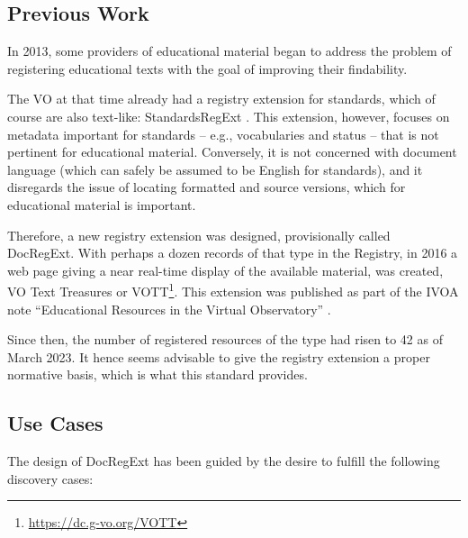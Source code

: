 \documentclass{ivoa}
\begin{document}
\subsection{Previous Work}

In 2013, some providers of educational material began to address the
problem of registering educational texts with the goal of improving
their findability.

The VO at that time already had a registry extension for standards, which of
course are also text-like: StandardsRegExt \citep{2012ivoa.spec.0508H}.  This extension,
however, focuses on metadata important for standards – e.g.,
vocabularies and status – that is not pertinent for educational
material.  Conversely, it is not concerned with document language (which
can safely be assumed to be English for standards), and it disregards
the issue of locating formatted and source versions, which for educational
material is important.

Therefore, a new registry extension was designed, provisionally called
DocRegExt.  With perhaps a dozen records of that type in the Registry,
in 2016 a web page giving a near real-time display of the available
material, was created, VO Text Treasures or
VOTT\footnote{\url{https://dc.g-vo.org/VOTT}}.  This extension was
published as part of the
IVOA note ``Educational Resources in the Virtual Observatory''
\citep{note:edumatters}.

Since then, the number of registered resources of the type
 had risen to 42 as of March 2023.  It hence seems
advisable to give the registry extension a proper normative basis, which
is what this standard provides.


\subsection{Use Cases}

\label{sect:regext-usecases}

The design of DocRegExt has been guided by the desire to fulfill the
following discovery cases:
\end{document}
